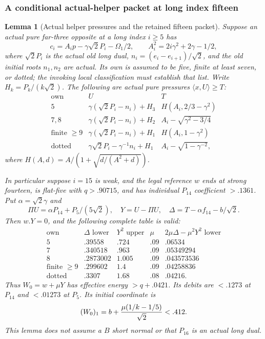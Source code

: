 \documentclass[11pt]{article}
\newtheorem{lemma}[theorem]{Lemma}
\theoremstyle{definition}
\theoremstyle{remark}
\newcommand{\ip}[2]{\langle #1,#2\rangle}
\begin{document}
\subsubsection{A conditional actual-helper packet at long index fifteen}
\begin{lemma}[Actual helper pressures and the retained fifteen packet]
\label{lem:I-helper15-pressure-packet}
Suppose an actual pure far-three opposite at a long index \(i\ge5\)
has
\[
 c_i=A_i p-\gamma\sqrt2P_i-\Omega_1/2,\qquad
 A_i^2=2i\gamma^2+2\gamma-1/2,
\]
where \(\sqrt2P_i\) is the actual old long dual,
\(n_i=(e_i-e_{i+1})/\sqrt2\), and the old initial roots
\(n_1,n_2\) are actual. Its own is assumed to be five, finite at
least seven, or dotted; the invoking local classification must establish
that list. Write \(H_k=P_k/(k\sqrt2)\).
The following are actual pure pressures \(\ip xU\ge T\):
\[
\begin{array}{c|c|c}
\text{own}&U&T\\ \hline
5&\gamma(\sqrt2P_i-n_i)+H_3&H(A_i,2/3-\gamma^2)\\
7,8&\gamma(\sqrt2P_i-n_i)+H_2&A_i-\sqrt{\gamma^2-3/4}\\
\text{finite }\ge9&\gamma(\sqrt2P_i-n_i)+H_1&H(A_i,1-\gamma^2)\\
\text{dotted}&\gamma\sqrt2P_i-\gamma^{-1}n_i+H_1&A_i-\sqrt{1-\gamma^{-2}},
\end{array}
\]
where \(H(A,d)=A/(1+\sqrt{d/(A^2+d)})\).

In particular suppose \(i=15\) is weak, and the legal reference \(w\)
ends at strong fourteen, is flat-five with \(q>.90715\), and has
individual \(P_{14}\) coefficient \(>.1361\).
Put \(\alpha=\sqrt2\gamma\) and
\[
 \Pi U=\alpha P_{14}+P_5/(5\sqrt2),\quad
 Y=U-\Pi U,\quad \Delta=T-\alpha f_{14}-b/\sqrt2.
\]
Then \(w.Y=0\), and the following complete table is valid:
\[
\begin{array}{c|c|c|c|c}
\text{own}&\Delta\text{ lower}&Y^2\text{ upper}&\mu&
 2\mu\Delta-\mu^2Y^2\text{ lower}\\ \hline
5&.39558&.724&.09&.06534\\
7&.340518&.963&.09&.05349294\\
8&.2873002&1.005&.09&.043573536\\
\text{finite }\ge9&.299602&1.4&.09&.04258836\\
\text{dotted}&.3307&1.68&.08&.04216 .
\end{array}
\]
Thus \(W_0=w+\mu Y\) has effective energy \(>q+.0421\).
Its debits are \(<.1273\) at \(P_{14}\) and \(<.01273\) at \(P_5\).
Its initial coordinate is
\[
 (W_0)_1=b+{\mu(1/k-1/5)\over\sqrt2}<.412.
\]
This lemma does not assume a \(B\) short normal or that \(P_{16}\)
is an actual long dual.
\end{lemma}
\end{document}
